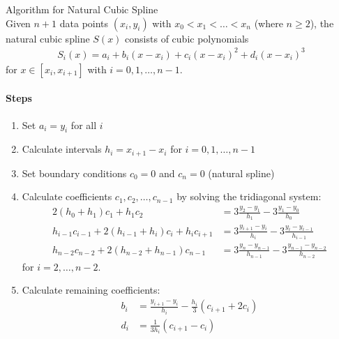 \begin{KR}{Algorithm for Natural Cubic Spline}\\
Given $n+1$ data points $(x_i, y_i)$ with $x_0 < x_1 < \ldots < x_n$ (where $n \geq 2$), the natural cubic spline $S(x)$ consists of cubic polynomials
\begin{align*}
S_i(x) = a_i + b_i(x-x_i) + c_i(x-x_i)^2 + d_i(x-x_i)^3
\end{align*}
for $x \in [x_i, x_{i+1}]$ with $i=0,1,\ldots,n-1$.

\paragraph{Steps}
\begin{enumerate}
    \item Set $a_i = y_i$ for all $i$
    \item Calculate intervals $h_i = x_{i+1} - x_i$ for $i=0,1,\ldots,n-1$
    \item Set boundary conditions $c_0 = 0$ and $c_n = 0$ (natural spline)
    \item Calculate coefficients $c_1, c_2, \ldots, c_{n-1}$ by solving the tridiagonal system:
    \begin{align*}
    2(h_0+h_1)c_1 + h_1c_2 &= 3\frac{y_2-y_1}{h_1} - 3\frac{y_1-y_0}{h_0}\\
    h_{i-1}c_{i-1} + 2(h_{i-1}+h_i)c_i + h_ic_{i+1} &= 3\frac{y_{i+1}-y_i}{h_i} - 3\frac{y_i-y_{i-1}}{h_{i-1}}\\
    h_{n-2}c_{n-2} + 2(h_{n-2}+h_{n-1})c_{n-1} &= 3\frac{y_n-y_{n-1}}{h_{n-1}} - 3\frac{y_{n-1}-y_{n-2}}{h_{n-2}}
    \end{align*}
    for $i = 2,\ldots,n-2$.
    \item Calculate remaining coefficients:
    \begin{align*}
    b_i &= \frac{y_{i+1}-y_i}{h_i} - \frac{h_i}{3}(c_{i+1} + 2c_i)\\
    d_i &= \frac{1}{3h_i}(c_{i+1} - c_i)
    \end{align*}
\end{enumerate}
\end{KR}

